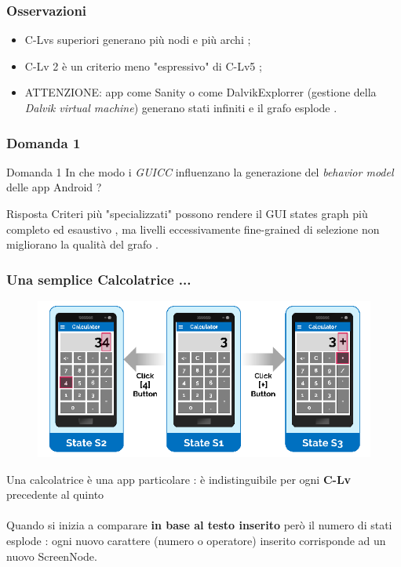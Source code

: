\documentclass[12pt]{beamer}
\begin{document}

\begin{frame}
\frametitle{Osservazioni}

\begin{itemize}
\item C-Lvs superiori generano pi\`u nodi e pi\`u archi ;

\item C-Lv 2 \`e un criterio meno "espressivo" di C-Lv5 ;

\item ATTENZIONE: app come Sanity o come DalvikExplorrer (gestione della \textit{Dalvik virtual machine}) generano stati infiniti e il grafo esplode .

\end{itemize}

\end{frame}


\begin{frame}
\frametitle{Domanda 1}

\begin{block}{Domanda 1}
In che modo i \emph{GUICC} influenzano la generazione del \textit{behavior model} delle app Android ?
\end{block} 
\begin{block}{Risposta}
Criteri pi\`u "specializzati" possono rendere il GUI states graph pi\`u completo ed esaustivo , ma livelli eccessivamente fine-grained di selezione non  migliorano la qualit\`a del grafo .
\end{block}

\end{frame}


\begin{frame}

\frametitle{Una semplice Calcolatrice ...}
\begin{figure}
\includegraphics[width=0.8\linewidth]{images/calculator.png}
\end{figure}
Una calcolatrice \`e una app particolare : \`e indistinguibile per ogni \textbf{C-Lv} precedente al quinto
\\~\\
Quando si inizia a comparare \textbf{in base al testo inserito} per\`o il numero di stati esplode : ogni nuovo carattere (numero o operatore) inserito corrisponde ad un nuovo ScreenNode.
\end{frame} 
\end{document}

